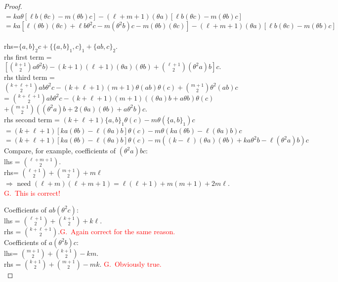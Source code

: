 \documentclass[12pt]{amsart}
\theoremstyle{plain}
\theoremstyle{definition}
\theoremstyle{remark}
\begin{document}
\begin{proof}
$=k a\theta[\ell b(\theta c)-m(\theta b)c]-(\ell+m+1)(\theta a)[\ell b(\theta c)-m(\theta b)c]$\\
$=k a[ \ell (\theta b)(\theta c)+ \ell b\theta^2c-m(\theta^2 b)c - m(\theta b)(\theta c)]-(\ell+m+1)(\theta a)[\ell b(\theta c)-m(\theta b)c]$\\
\\
rhs=$\{a, b\}_2c+\{\{a, b\}_1, c\}_1+\{ab, c\}_2$.\\
rhs first term =\\
$[{k+1\choose 2}a\theta^2 b)-(k+1)(\ell+1)(\theta a)(\theta b)+{\ell+1\choose 2}(\theta^2 a)b]c$.\\
rhs third term =\\
${k+\ell+1\choose 2}ab\theta^2 c-(k+\ell+1)(m+1)\theta(ab)\theta(c)+{m+1\choose 2}\theta^2(ab)c$\\
=
${k+\ell+1\choose 2}ab\theta^2 c-(k+\ell+1)(m+1)((\theta a)b+a\theta b)\theta(c)$\\
$+{m+1\choose 2}((\theta^2a)b+2(\theta a)(\theta b)+a\theta^2 b)c$.\\
rhs second term = $(k+\ell+1)\{a, b\}_1\theta(c)- m\theta(\{a, b\}_1)c$\\
$=(k+\ell+1)[ka(\theta b)-\ell(\theta a)b]\theta(c)- m\theta(k a(\theta b)-\ell(\theta a)b)c$\\
$=(k+\ell+1)[ka(\theta b)-\ell(\theta a)b]\theta(c)- m((k-\ell) (\theta a)(\theta b)+ka\theta^2b-\ell(\theta^2 a)b)c$\\

\medskip
Compare, for example, coefficients of $(\theta^2 a)bc$:\\
lhs = ${\ell+m+1\choose 2}.$\\
rhs= ${\ell+1\choose 2}+{m+1\choose 2}+m\ell$\\
$\Rightarrow$ need $(\ell+m)(\ell+m+1)=
\ell(\ell+1)+m(m+1)+2m\ell.$
\textcolor{red}{G.\ This is correct!}

\medskip\noindent
Coefficients of $ab(\theta^2c)$:\\
lhs = ${\ell+1\choose 2}+{k+1\choose 2}+k\ell$.\\
rhs = ${k+\ell+1\choose2}$.\textcolor{red}{G.\ Again correct for the same reason.}\\

\medskip\noindent  
Coefficients of $a(\theta^2b)c$:\\
lhs= ${m+1\choose 2}+{k+1\choose2}-km$.\\
rhs = ${k+1\choose2}+{m+1\choose2}-mk$.
\textcolor{red}{G.\ Obviously true.}\\


\end{proof}
\end{document}
